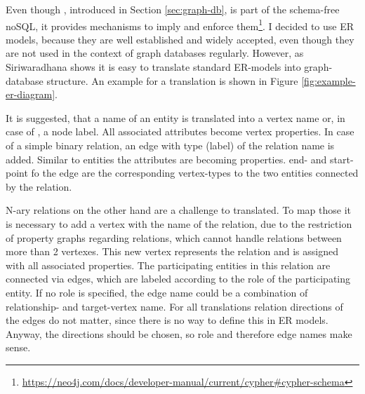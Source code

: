 Even though \neoj, introduced in Section \ref{sec:graph-db}, is part of the schema-free noSQL, it provides mechanisms to imply and enforce them\footnote{\url{https://neo4j.com/docs/developer-manual/current/cypher\#cypher-schema}}.
I decided to use ER models, because they are well established and widely accepted, even though they are not used in the context of graph databases regularly.
However, as Siriwaradhana shows it is easy to translate standard ER-models into graph-database structure. \cite{Siriwaradhana2014}
An example for a translation is shown in Figure \ref{fig:example-er-diagram}.

It is suggested, that a name of an entity is translated into a vertex name or, in case of \neoj, a node label. All associated attributes become vertex properties.
In case of a simple binary relation, an edge with type (\neoj label) of the relation name is added. Similar to entities the attributes are becoming properties. end- and start-point fo the edge are the corresponding vertex-types to the two entities connected by the relation.

N-ary relations on the other hand are a challenge to translated. To map those it is necessary to add a vertex with the name of the relation, due to the restriction of property graphs regarding relations, which cannot handle relations between more than 2 vertexes.
This new vertex represents the relation and is assigned with all associated properties. The participating entities in this relation are connected via edges, which are labeled according to the role of the participating entity. If no role is specified, the edge name could be a combination of relationship- and target-vertex name.
For all translations relation directions of the edges do not matter, since there is no way to define this in ER models. Anyway, the directions should be chosen, so role and therefore edge names make sense.

